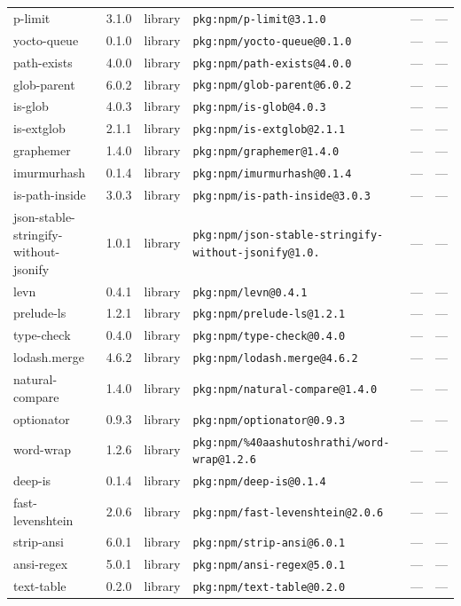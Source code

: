 \documentclass[11pt]{article}
\begin{document}
\begin{longtable}{|l|l|l|p{2.2cm}|l|p{4cm}|}
p-limit & 3.1.0 & library & \texttt{pkg:npm/p-limit@3.1.0} & — & — \\
yocto-queue & 0.1.0 & library & \texttt{pkg:npm/yocto-queue@0.1.0} & — & — \\
path-exists & 4.0.0 & library & \texttt{pkg:npm/path-exists@4.0.0} & — & — \\
glob-parent & 6.0.2 & library & \texttt{pkg:npm/glob-parent@6.0.2} & — & — \\
is-glob & 4.0.3 & library & \texttt{pkg:npm/is-glob@4.0.3} & — & — \\
is-extglob & 2.1.1 & library & \texttt{pkg:npm/is-extglob@2.1.1} & — & — \\
graphemer & 1.4.0 & library & \texttt{pkg:npm/graphemer@1.4.0} & — & — \\
imurmurhash & 0.1.4 & library & \texttt{pkg:npm/imurmurhash@0.1.4} & — & — \\
is-path-inside & 3.0.3 & library & \texttt{pkg:npm/is-path-inside@3.0.3} & — & — \\
json-stable-stringify-without-jsonify & 1.0.1 & library & \texttt{pkg:npm/json-stable-stringify-without-jsonify@1.0.} & — & — \\
levn & 0.4.1 & library & \texttt{pkg:npm/levn@0.4.1} & — & — \\
prelude-ls & 1.2.1 & library & \texttt{pkg:npm/prelude-ls@1.2.1} & — & — \\
type-check & 0.4.0 & library & \texttt{pkg:npm/type-check@0.4.0} & — & — \\
lodash.merge & 4.6.2 & library & \texttt{pkg:npm/lodash.merge@4.6.2} & — & — \\
natural-compare & 1.4.0 & library & \texttt{pkg:npm/natural-compare@1.4.0} & — & — \\
optionator & 0.9.3 & library & \texttt{pkg:npm/optionator@0.9.3} & — & — \\
word-wrap & 1.2.6 & library & \texttt{pkg:npm/\%40aashutoshrathi/word-wrap@1.2.6} & — & — \\
deep-is & 0.1.4 & library & \texttt{pkg:npm/deep-is@0.1.4} & — & — \\
fast-levenshtein & 2.0.6 & library & \texttt{pkg:npm/fast-levenshtein@2.0.6} & — & — \\
strip-ansi & 6.0.1 & library & \texttt{pkg:npm/strip-ansi@6.0.1} & — & — \\
ansi-regex & 5.0.1 & library & \texttt{pkg:npm/ansi-regex@5.0.1} & — & — \\
text-table & 0.2.0 & library & \texttt{pkg:npm/text-table@0.2.0} & — & — \\

\end{longtable}
\end{document}
